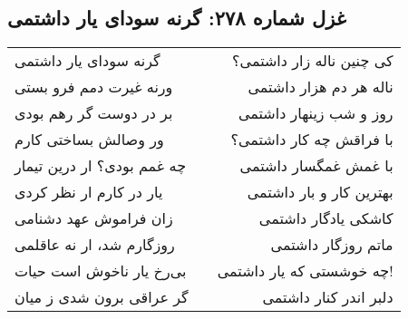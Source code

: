 \begin{center}
\section*{غزل شماره ۲۷۸: گرنه سودای یار داشتمی}
\label{sec:278}
\begin{longtable}{l p{0.5cm} r}
گرنه سودای یار داشتمی
&&
کی چنین ناله زار داشتمی؟
\\
ورنه غیرت دمم فرو بستی
&&
ناله هر دم هزار داشتمی
\\
بر در دوست گر رهم بودی
&&
روز و شب زینهار داشتمی
\\
ور وصالش بساختی کارم
&&
با فراقش چه کار داشتمی؟
\\
چه غمم بودی؟ ار درین تیمار
&&
با غمش غمگسار داشتمی
\\
یار در کارم ار نظر کردی
&&
بهترین کار و بار داشتمی
\\
زان فراموش عهد دشنامی
&&
کاشکی یادگار داشتمی
\\
روزگارم شد، ار نه عاقلمی
&&
ماتم روزگار داشتمی
\\
بی‌رخ یار ناخوش است حیات
&&
چه خوشستی که یار داشتمی!
\\
گر عراقی برون شدی ز میان
&&
دلبر اندر کنار داشتمی
\\
\end{longtable}
\end{center}
